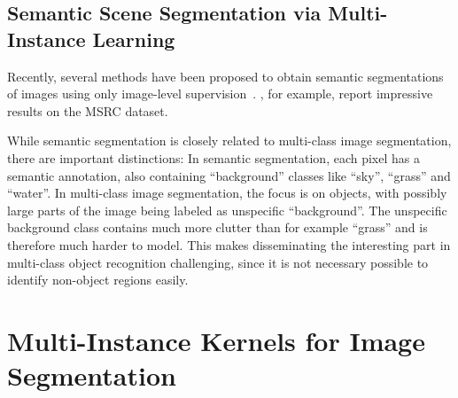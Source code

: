 

\subsection{Semantic Scene Segmentation via Multi-Instance Learning}
Recently, several methods have been proposed to obtain semantic segmentations of images using only
image-level supervision~\citep{vezhnevets2011weakly,verbeek2007region,vezhnevets2010towards}. \citet{vezhnevets2011weakly},
for example, report impressive results on the MSRC dataset.

While semantic segmentation is closely related to multi-class image segmentation, there are important
distinctions: In semantic segmentation, each pixel has a semantic annotation, also containing ``background''
classes like ``sky'', ``grass'' and ``water''. In multi-class image segmentation, the focus is on
objects, with possibly large parts of the image being labeled as unspecific ``background''.
The unspecific background class contains much more clutter than for example ``grass'' and is therefore
much harder to model.
This makes disseminating the interesting part in multi-class object recognition challenging, since it
is not necessary possible to identify non-object regions easily.


\section{Multi-Instance Kernels for Image Segmentation}
